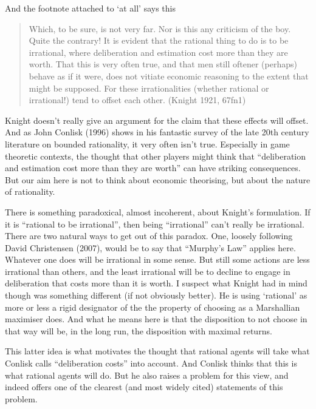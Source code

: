 \documentclass[
  12pt,
]{article}
\begin{document}
And the footnote attached to `at all' says this

\begin{quote}
Which, to be sure, is not very far. Nor is this any criticism of the boy. Quite the contrary! It is evident that the rational thing to do is to be irrational, where deliberation and estimation cost more than they are worth. That this is very often true, and that men still oftener (perhaps) behave as if it were, does not vitiate economic reasoning to the extent that might be supposed. For these irrationalities (whether rational or irrational!) tend to offset each other. (Knight 1921, 67fn1)
\end{quote}

Knight doesn't really give an argument for the claim that these effects will offset. And as John Conlisk (1996) shows in his fantastic survey of the late 20th century literature on bounded rationality, it very often isn't true. Especially in game theoretic contexts, the thought that other players might think that ``deliberation and estimation cost more than they are worth'' can have striking consequences. But our aim here is not to think about economic theorising, but about the nature of rationality.

There is something paradoxical, almost incoherent, about Knight's formulation. If it is ``rational to be irrational'', then being ``irrational'' can't really be irrational. There are two natural ways to get out of this paradox. One, loosely following David Christensen (2007), would be to say that ``Murphy's Law'' applies here. Whatever one does will be irrational in some sense. But still some actions are less irrational than others, and the least irrational will be to decline to engage in deliberation that costs more than it is worth. I suspect what Knight had in mind though was something different (if not obviously better). He is using `rational' as more or less a rigid designator of the the property of choosing as a Marshallian maximiser does. And what he means here is that the disposition to not choose in that way will be, in the long run, the disposition with maximal returns.

This latter idea is what motivates the thought that rational agents will take what Conlisk calls ``deliberation costs'' into account. And Conlisk thinks that this is what rational agents will do. But he also raises a problem for this view, and indeed offers one of the clearest (and most widely cited) statements of this problem.
\end{document}
